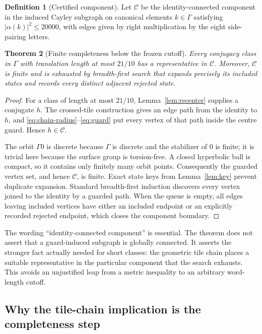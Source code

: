\documentclass[11pt,a4paper]{article}
\newtheorem{theorem}{Theorem}[section]
\theoremstyle{definition}
\newtheorem{definition}[theorem]{Definition}
\begin{document}
\begin{definition}[Certified component]
Let \(\mathcal C\) be the identity-connected component in the induced Cayley
subgraph on canonical elements \(k\in\Gamma\) satisfying
\(|\alpha(k)|^2\leq20000\), with edges given by right multiplication by the
eight side-pairing letters.
\end{definition}

\begin{theorem}[Finite completeness below the frozen cutoff]
\label{thm:complete}
Every conjugacy class in \(\Gamma\) with translation length at most \(21/10\)
has a representative in \(\mathcal C\).  Moreover, \(\mathcal C\) is finite
and is exhausted by breadth-first search that expands precisely its included
states and records every distinct adjacent rejected state.
\end{theorem}

\begin{proof}
For a class of length at most \(21/10\), Lemma~\ref{lem:recenter} supplies a
conjugate \(h\).  The crossed-tile construction gives an edge path from the
identity to \(h\), and \eqref{eq:chain-radius}--\eqref{eq:guard} put every
vertex of that path inside the centre guard.  Hence \(h\in\mathcal C\).

The orbit \(\Gamma0\) is discrete because \(\Gamma\) is discrete and the
stabilizer of \(0\) is finite; it is trivial here because the surface group is
torsion-free.  A closed hyperbolic ball is compact, so it contains only
finitely many orbit points.  Consequently the guarded vertex set, and hence
\(\mathcal C\), is finite.  Exact state keys from Lemma~\ref{lem:key} prevent
duplicate expansion.  Standard breadth-first induction discovers every
vertex joined to the identity by a guarded path.  When the queue is empty,
all edges leaving included vertices have either an included endpoint or an
explicitly recorded rejected endpoint, which closes the component boundary.
\end{proof}

The wording ``identity-connected component'' is essential.  The theorem does
not assert that a guard-induced subgraph is globally connected.  It asserts
the stronger fact actually needed for short classes: the geometric tile
chain places a suitable representative in the particular component that the
search exhausts.  This avoids an unjustified leap from a metric inequality to
an arbitrary word-length cutoff.

\subsection{Why the tile-chain implication is the completeness step}
\end{document}
